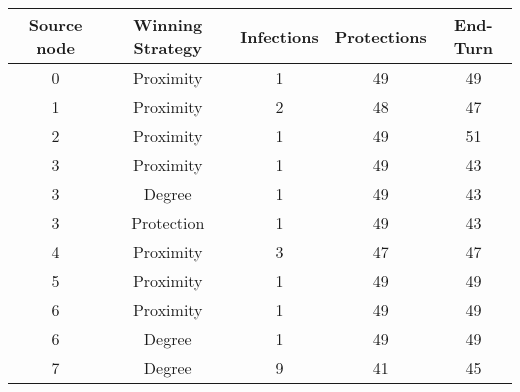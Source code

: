 \documentclass[results.tex]{subfiles}
\begin{document}
    \begin{center}
        \begin{tabular}{| c || c | c | c | c |}
            \hline
            {\bfseries Source node} & {\bfseries Winning Strategy} & {\bfseries Infections} & {\bfseries Protections}
            & {\bfseries End-Turn}
            \\  %
            \hline\hline
            0                       & Proximity                    & 1                      & 49                      & 49                   \\
            \hline
            1                       & Proximity                    & 2                      & 48                      & 47                   \\
            \hline
            2                       & Proximity                    & 1                      & 49                      & 51                   \\
            \hline
            3                       & Proximity                    & 1                      & 49                      & 43                   \\
            \hline
            3                       & Degree                       & 1                      & 49                      & 43                   \\
            \hline
            3                       & Protection                   & 1                      & 49                      & 43                   \\
            \hline
            4                       & Proximity                    & 3                      & 47                      & 47                   \\
            \hline
            5                       & Proximity                    & 1                      & 49                      & 49                   \\
            \hline
            6                       & Proximity                    & 1                      & 49                      & 49                   \\
            \hline
            6                       & Degree                       & 1                      & 49                      & 49                   \\
            \hline
            7                       & Degree                       & 9                      & 41                      & 45                   \\

\end{tabular}
\end{center}
\end{document}
